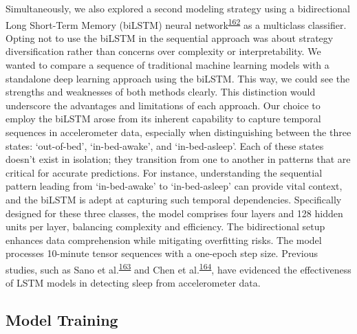 \documentclass[
  10pt,
]{scrbook}
\begin{document}
Simultaneously, we also explored a second modeling strategy using a
bidirectional Long Short-Term Memory (biLSTM) neural
network\textsuperscript{\protect\hyperlink{ref-hochreiter_long_1997}{162}}
as a multiclass classifier. Opting not to use the biLSTM in the
sequential approach was about strategy diversification rather than
concerns over complexity or interpretability. We wanted to compare a
sequence of traditional machine learning models with a standalone deep
learning approach using the biLSTM. This way, we could see the strengths
and weaknesses of both methods clearly. This distinction would
underscore the advantages and limitations of each approach. Our choice
to employ the biLSTM arose from its inherent capability to capture
temporal sequences in accelerometer data, especially when distinguishing
between the three states: `out-of-bed', `in-bed-awake', and
`in-bed-asleep'. Each of these states doesn't exist in isolation; they
transition from one to another in patterns that are critical for
accurate predictions. For instance, understanding the sequential pattern
leading from `in-bed-awake' to `in-bed-asleep' can provide vital
context, and the biLSTM is adept at capturing such temporal
dependencies. Specifically designed for these three classes, the model
comprises four layers and 128 hidden units per layer, balancing
complexity and efficiency. The bidirectional setup enhances data
comprehension while mitigating overfitting risks. The model processes
10-minute tensor sequences with a one-epoch step size. Previous studies,
such as Sano et
al.\textsuperscript{\protect\hyperlink{ref-sano_multimodal_2019}{163}}
and Chen et
al.\textsuperscript{\protect\hyperlink{ref-chen_attention_2021}{164}},
have evidenced the effectiveness of LSTM models in detecting sleep from
accelerometer data.

\hypertarget{model-training}{%
\subsection{Model Training}\label{model-training}}
\end{document}
